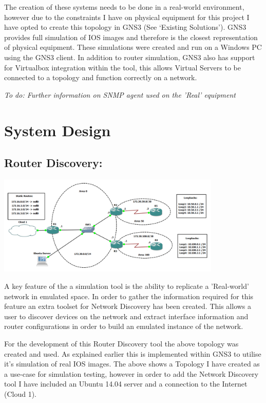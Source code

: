 \documentclass[11pt]{report}
\begin{document}
The creation of these systems needs to be done in a real-world environment, however due to the constraints I have on physical equipment for this project I have opted to create this topology in GNS3 (See ‘Existing Solutions’). GNS3 provides full simulation of IOS images and therefore is the closest representation of physical equipment. These simulations were created and run on a Windows PC using the GNS3 client. In addition to router simulation, GNS3 also has support for Virtualbox integration within the tool, this allows Virtual Servers to be connected to a topology and function correctly on a network.

\textit{To do: Further information on SNMP agent used on the 'Real' equipment}

\chapter{System Design}

\section{Router Discovery:}

\begin{center}
\includegraphics[width=0.8\textwidth]{Lab-Design.png}
\end{center}

A key feature of the a simulation tool is the ability to replicate a 'Real-world' network in emulated space. In order to gather the information required for this feature an extra toolset for Network Discovery has been created. This allows a user to discover devices on the network and extract interface information and router configurations in order to build an emulated instance of the network.

For the development of this Router Discovery tool the above topology was created and used. As explained earlier this is implemented within GNS3 to utilise it's simulation of real IOS images. The above shows a Topology I have created as a use-case for simulation testing, however in order to add the Network Discovery tool I have included an Ubuntu 14.04 server and a connection to the Internet (Cloud 1).
\end{document}
